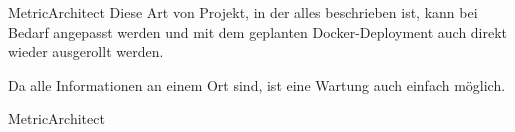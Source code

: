 \documentclass[12pt, pdf, xcolor={table, dvipsnames}, paperheight=8cm,paperwidth=12cm]{beamer}
\begin{document}
\begin{frame}{MetricArchitect}
	Diese Art von Projekt, in der alles beschrieben ist, kann bei Bedarf angepasst werden und mit dem geplanten Docker-Deployment auch direkt wieder ausgerollt werden.
	
	\vspace{1em}
	Da alle Informationen an einem Ort sind, ist eine Wartung auch einfach möglich.
	
	
	\begin{center}
	\end{center}
	
\end{frame}

\begin{frame}{MetricArchitect}
	\LARGE{}
\end{frame}
\end{document}
